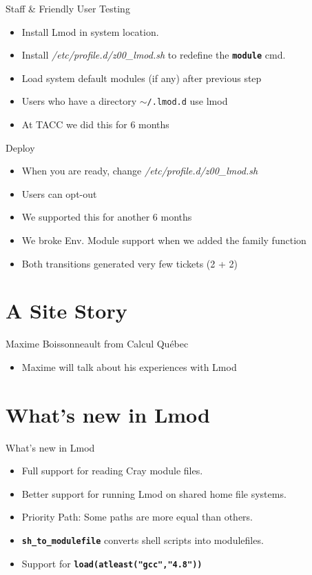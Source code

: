 \documentclass{beamer}
\begin{document}
\begin{frame}{Staff \& Friendly User Testing}
  \begin{itemize}
    \item Install Lmod in system location.
    \item Install \emph{/etc/profile.d/z00\_lmod.sh} to redefine the
      \texttt{\bf module} cmd.
    \item Load system  default modules (if any) after previous step
    \item Users who have a directory \texttt{$\sim$/.lmod.d} use lmod
    \item At TACC we did this for 6 months
  \end{itemize}
\end{frame}

\begin{frame}{Deploy}
  \begin{itemize}
    \item When you are ready, change \emph{/etc/profile.d/z00\_lmod.sh}
    \item Users can opt-out
    \item We supported this for another 6 months
    \item We broke Env. Module support when we added the family function
    \item Both transitions generated very few tickets (2 + 2)
  \end{itemize}
\end{frame}


\section{A Site Story}

\begin{frame}{Maxime Boissonneault from Calcul Qu\'{e}bec}
  \begin{itemize}
      \item Maxime will talk about his experiences with Lmod
  \end{itemize}
\end{frame}


\section{What's new in Lmod}

\begin{frame}{What's new in Lmod}
  \begin{itemize}
      \item Full support for reading Cray module files.
      \item Better support for running Lmod on shared home file systems.
      \item Priority Path: Some paths are more equal than others.
      \item \texttt{\bf sh\_to\_modulefile} converts shell scripts into modulefiles.
      \item Support for \texttt{\bf load(atleast("gcc","4.8"))}
  \end{itemize}
\end{frame}
\end{document}

